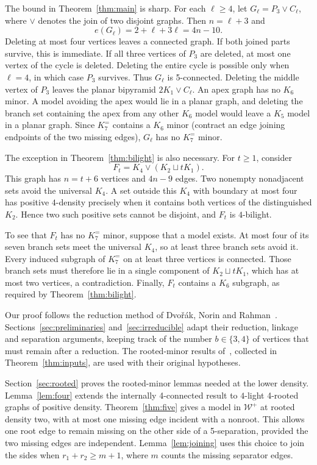 \documentclass[11pt]{article}
\theoremstyle{remark}
\numberwithin{equation}{section}
\newcommand{\Ke}{K_7^{=}}
\newcommand{\W}{\mathcal W}
\begin{document}
The bound in Theorem~\ref{thm:main} is sharp.
For each $\ell\ge4$, let $G_\ell=P_3\vee C_\ell$, where $\vee$ denotes the join of two disjoint graphs. Then $n=\ell+3$ and
\[
e(G_\ell)=2+\ell+3\ell=4n-10.
\]
Deleting at most four vertices leaves a connected graph. If both joined parts survive, this is immediate. If all three vertices of $P_3$ are deleted, at most one vertex of the cycle is deleted. Deleting the entire cycle is possible only when $\ell=4$, in which case $P_3$ survives. Thus $G_\ell$ is 5-connected. Deleting the middle vertex of $P_3$ leaves the planar bipyramid $2K_1\vee C_\ell$. An apex graph has no $K_6$ minor. A model avoiding the apex would lie in a planar graph, and deleting the branch set containing the apex from any other $K_6$ model would leave a $K_5$ model in a planar graph. Since $\Ke$ contains a $K_6$ minor (contract an edge joining endpoints of the two missing edges), $G_\ell$ has no $\Ke$ minor.

The exception in Theorem~\ref{thm:bilight} is also necessary. For $t\ge1$, consider
\begin{equation}\label{eq:Ft}
F_t=K_4\vee(K_2\sqcup tK_1).
\end{equation}
This graph has $n=t+6$ vertices and $4n-9$ edges. Two nonempty nonadjacent sets avoid the universal $K_4$. A set outside this $K_4$ with boundary at most four has positive $4$-density precisely when it contains both vertices of the distinguished $K_2$. Hence two such positive sets cannot be disjoint, and $F_t$ is $4$-bilight.

To see that $F_t$ has no $\Ke$ minor, suppose that a model exists. At most four of its seven branch sets meet the universal $K_4$, so at least three branch sets avoid it. Every induced subgraph of $\Ke$ on at least three vertices is connected. Those branch sets must therefore lie in a single component of $K_2\sqcup tK_1$, which has at most two vertices, a contradiction. Finally, $F_t$ contains a $K_6$ subgraph, as required by Theorem~\ref{thm:bilight}.

Our proof follows the reduction method of Dvo\v r\'ak, Norin and Rahman~\cite{DNR26}. Sections~\ref{sec:preliminaries} and~\ref{sec:irreducible} adapt their reduction, linkage and separation arguments, keeping track of the number $b\in\{3,4\}$ of vertices that must remain after a reduction. The rooted-minor results of~\cite{Dvo26,DNR26,NT25}, collected in Theorem~\ref{thm:inputs}, are used with their original hypotheses.

Section~\ref{sec:rooted} proves the rooted-minor lemmas needed at the lower density. Lemma~\ref{lem:four} extends the internally 4-connected result to $4$-light 4-rooted graphs of positive density. Theorem~\ref{thm:five} gives a model in $\W^+$ at rooted density two, with at most one missing edge incident with a nonroot. This allows one root edge to remain missing on the other side of a 5-separation, provided the two missing edges are independent. Lemma~\ref{lem:joining} uses this choice to join the sides when $r_1+r_2\ge m+1$, where $m$ counts the missing separator edges.
\end{document}
